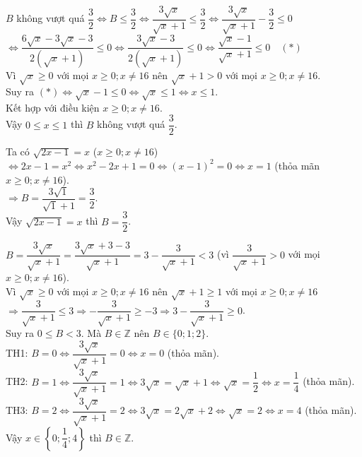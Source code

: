 \documentclass[12pt]{article}
\begin{document}
\begin{bt}
{\begin{cacy}
\item $B$ không vượt quá $\dfrac{3}{2} \Leftrightarrow B \le \dfrac{3}{2} \Leftrightarrow \dfrac{3\sqrt{x}}{\sqrt{x}+1} \le \dfrac{3}{2} \Leftrightarrow \dfrac{3\sqrt{x}}{\sqrt{x}+1} - \dfrac{3}{2} \le 0$\\
$\Leftrightarrow \dfrac{6\sqrt{x}-3\sqrt{x}-3}{2\left(\sqrt{x}+1\right)} \le 0 \Leftrightarrow \dfrac{3\sqrt{x}-3}{2\left(\sqrt{x}+1\right)} \le 0 \Leftrightarrow \dfrac{\sqrt{x}-1}{\sqrt{x}+1} \le 0 \quad (*)$\\
Vì $\sqrt{x} \ge 0$ với mọi $x \ge 0; x \ne 16$ nên $\sqrt{x}+1 > 0$ với mọi $x \ge 0; x \ne 16$.\\
Suy ra $(*)\Leftrightarrow \sqrt{x}-1 \le 0 \Leftrightarrow \sqrt{x} \le 1 \Leftrightarrow x \le 1$.\\
Kết hợp với điều kiện $x \ge 0; x \ne 16$.\\
Vậy $0 \le x \le 1$ thì $B$ không vượt quá $\dfrac{3}{2}$.

\item Ta có $\sqrt{2x-1} = x$ ($x \ge 0; x \ne 16$) $\Leftrightarrow 2x-1 = x^2 \Leftrightarrow x^2-2x+1 = 0 \Leftrightarrow (x-1)^2 = 0 \Leftrightarrow x = 1$ (thỏa mãn $x \ge 0; x \ne 16$).\\
$\Rightarrow B = \dfrac{3\sqrt{1}}{\sqrt{1}+1} = \dfrac{3}{2}$.\\
Vậy $\sqrt{2x-1} = x$ thì $B = \dfrac{3}{2}$.

\item $B = \dfrac{3\sqrt{x}}{\sqrt{x}+1} = \dfrac{3\sqrt{x}+3-3}{\sqrt{x}+1} = 3 - \dfrac{3}{\sqrt{x}+1} < 3$ (vì $\dfrac{3}{\sqrt{x}+1} > 0$ với mọi $x \ge 0; x \ne 16$).\\
Vì $\sqrt{x} \ge 0$ với mọi $x \ge 0; x \ne 16$ nên $\sqrt{x}+1 \ge 1$ với mọi $x \ge 0; x \ne 16$\\
$\Rightarrow \dfrac{3}{\sqrt{x}+1} \le 3 \Rightarrow -\dfrac{3}{\sqrt{x}+1} \ge -3 \Rightarrow 3 - \dfrac{3}{\sqrt{x}+1} \ge 0$.\\
Suy ra $0 \le B < 3$. Mà $B \in \mathbb{Z}$ nên $B \in \{0; 1; 2\}$.\\
TH1: $B = 0 \Leftrightarrow \dfrac{3\sqrt{x}}{\sqrt{x}+1} = 0 \Leftrightarrow x = 0$ (thỏa mãn).\\
TH2: $B = 1 \Leftrightarrow \dfrac{3\sqrt{x}}{\sqrt{x}+1} = 1 \Leftrightarrow 3\sqrt{x} = \sqrt{x}+1 \Leftrightarrow \sqrt{x} = \dfrac{1}{2} \Leftrightarrow x = \dfrac{1}{4}$ (thỏa mãn).\\
TH3: $B = 2 \Leftrightarrow \dfrac{3\sqrt{x}}{\sqrt{x}+1} = 2 \Leftrightarrow 3\sqrt{x} = 2\sqrt{x}+2 \Leftrightarrow \sqrt{x} = 2 \Leftrightarrow x = 4$ (thỏa mãn).\\
Vậy $x \in \left\{0; \dfrac{1}{4}; 4\right\}$ thì $B \in \mathbb{Z}$.
\end{cacy}
}
\end{bt}
\end{document}
